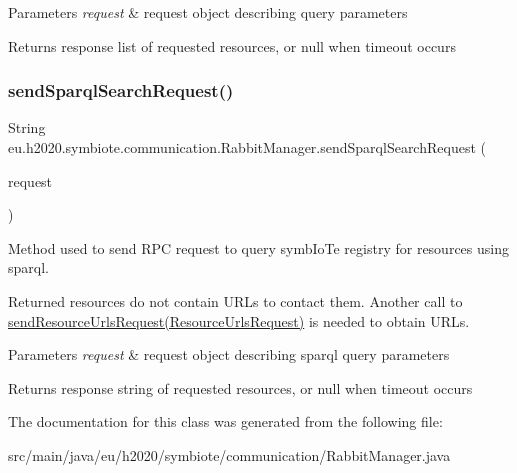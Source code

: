 \begin{DoxyParams}{Parameters}
{\em request} & request object describing query parameters \\
\hline
\end{DoxyParams}
\begin{DoxyReturn}{Returns}
response list of requested resources, or null when timeout occurs 
\end{DoxyReturn}
\mbox{\label{classeu_1_1h2020_1_1symbiote_1_1communication_1_1RabbitManager_a33cffe584ceba766deba679997ca68a4}} 
\subsubsection{\texorpdfstring{send\+Sparql\+Search\+Request()}{sendSparqlSearchRequest()}}
{\footnotesize\ttfamily String eu.\+h2020.\+symbiote.\+communication.\+Rabbit\+Manager.\+send\+Sparql\+Search\+Request (\begin{DoxyParamCaption}\item[{Core\+Sparql\+Query\+Request}]{request }\end{DoxyParamCaption})}

Method used to send R\+PC request to query symb\+Io\+Te registry for resources using sparql. 

Returned resources do not contain U\+R\+Ls to contact them. Another call to \hyperlink{classeu_1_1h2020_1_1symbiote_1_1communication_1_1RabbitManager_a56ce4aea24a797b642a52a3071acf0cb}{send\+Resource\+Urls\+Request(\+Resource\+Urls\+Request)} is needed to obtain U\+R\+Ls.


\begin{DoxyParams}{Parameters}
{\em request} & request object describing sparql query parameters \\
\hline
\end{DoxyParams}
\begin{DoxyReturn}{Returns}
response string of requested resources, or null when timeout occurs 
\end{DoxyReturn}


The documentation for this class was generated from the following file\+:\begin{DoxyCompactItemize}
\item 
src/main/java/eu/h2020/symbiote/communication/Rabbit\+Manager.\+java\end{DoxyCompactItemize}
